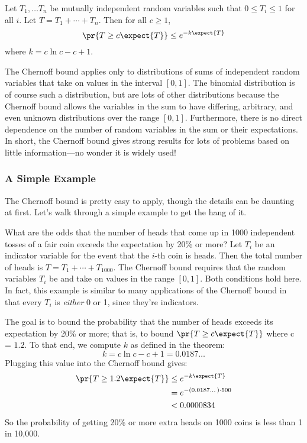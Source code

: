 \begin{theorem}
\label{chernoff}
Let $T_1, \dots T_n$ be mutually independent random variables such
that $0 \leq T_i \leq 1$ for all $i$.  Let $T = T_1 + \cdots + T_n$.
Then for all $c \geq 1$,
\begin{equation}\label{chernoff-leq}
\pr{T \geq c \expect{T}} \leq e^{-k \expect{T}}
\end{equation}
where $k = c \ln c - c + 1$.
\end{theorem}

The Chernoff bound applies only to distributions of sums of
independent random variables that take on values in the interval $[0,
  1]$.  The binomial distribution is of course such a distribution,
but are lots of other distributions because the Chernoff bound allows
the variables in the sum to have differing, arbitrary, and even unknown
distributions over the range $[0, 1]$.  Furthermore, there is no
direct dependence on the number of random variables in the sum or
their expectations.  In short, the Chernoff bound gives strong results
for lots of problems based on little information---no wonder it is
widely used!

\subsubsection{A Simple Example}

The Chernoff bound is pretty easy to apply, though the details can be
daunting at first.  Let's walk through a simple example to get the
hang of it.

What are the odds that the number of heads that come up in 1000
independent tosses of a fair coin exceeds the expectation by 20\% or
more?  Let $T_i$ be an indicator variable for the event that the
$i$-th coin is heads.  Then the total number of heads is $T = T_1 +
\cdots + T_{1000}$.  The Chernoff bound requires that the random
variables $T_i$ be  and take on values in the
range $[0, 1]$.  Both conditions hold here.  In fact, this example is
similar to many applications of the Chernoff bound in that every $T_i$
is \emph{either} 0 or 1, since they're indicators.

The goal is to bound the probability that the number of heads exceeds
its expectation by 20\% or more; that is, to bound $\pr{T \geq c
  \expect{T}}$ where c = $1.2$.  To that end, we compute $k$ as
defined in the theorem:
\[
k = c \ln c - c + 1 = 0.0187\dots
\]
Plugging this value into the Chernoff bound gives:
\begin{align*}
\pr{T \geq 1.2 \expect{T}} & \leq  e^{- k \expect{T}} \\
  & = e^{- (0.0187\dots) \cdot 500} \\
  & <  0.0000834
\end{align*}
So the probability of getting 20\% or more extra heads on 1000 coins is
less than 1 in 10,000.

